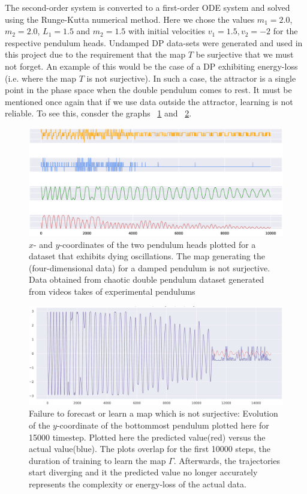 \documentclass[a4paper,12pt,twoside]{report}
\begin{document}
The second-order system is converted to a first-order ODE system and solved using the Runge-Kutta numerical method.  
Here we chose the values $m_1=2.0$, $m_2=2.0$, $L_1=1.5$ and $m_2=1.5$ with initial velocities $v_1=1.5, v_2=-2$ for the respective pendulum heads.
Undamped DP data-sets were generated and used in this project due to the requirement that the map $T$ be surjective that we must not forget. 
An example of this would be the case of a DP exhibiting energy-loss (i.e. where the map $T$ is not surjective). In such a case, the attractor is a single point in the phase space when the double pendulum comes to rest. 
It must be mentioned once again that if we use data outside the attractor, learning is not reliable. To see this, consder the graphs ~\ref{fig:damped_pendulum} and ~\ref{fig:dp_notsurjective}.

\begin{figure}[ht]
  \includegraphics[scale=0.4]{_dp_dying.eps}
  \centering
\caption{$x$- and $y$-coordinates of the two pendulum heads plotted for a dataset that exhibits dying oscillations. The map generating the (four-dimensional data) for a damped pendulum is not surjective. Data obtained from chaotic double pendulum dataset generated from videos takes of experimental pendulums~\cite{asseman2018learning}}
\label{fig:damped_pendulum}
\end{figure}



\begin{figure}[ht]
  \includegraphics[scale=0.3]{_dpfail_nonsurj.eps}
  \centering
\caption{Failure to forecast or learn a map which is not surjective: Evolution of the $y$-coordinate of the bottommost pendulum plotted here for 15000 timestep. Plotted here the predicted value(red) versus the actual value(blue). The plots overlap for the first 10000 steps, the duration of training to learn the map $\Gamma$. Afterwards, the trajectories start diverging and it the predicted value no longer accurately represents the complexity or energy-loss of the actual data. }
\label{fig:dp_notsurjective}
\end{figure}
\end{document}
